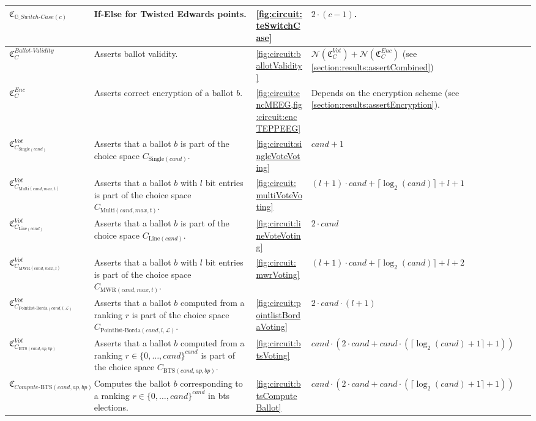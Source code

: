 \begin{longtable}{|L{4cm}|L{5.5cm}|L{1.3cm}|L{3cm}|}
    $\mathfrak{C}_{\mathbb{G}\_Switch\text{-}Case(c)}$ & If-Else for Twisted Edwards points. & \cref{fig:circuit:teSwitchCase} & $2\cdot (c-1)$.\\
    \hline
    $\mathfrak{C}_{C}^{Ballot\text{-}Validity}$ & Asserts ballot validity. & \cref{fig:circuit:ballotValidity} & $\mathcal{N}(\mathfrak{C}_C^{Vot}) + \mathcal{N}(\mathfrak{C}_C^{Enc})$ (see \cref{section:results:assertCombined})\\
    $\mathfrak{C}_{C}^{Enc}$ & Asserts correct encryption of a ballot $b$. & \cref{fig:circuit:encMEEG,fig:circuit:encTEPPEEG} & Depends on the encryption scheme (see \cref{section:results:assertEncryption}). \\
    $\mathfrak{C}_{C_{\text{Single}(cand)}}^{Vot}$ & Asserts that a ballot $b$ is part of the choice space $C_{\text{Single}(cand)}$. & \cref{fig:circuit:singleVoteVoting} & $cand + 1$\\
    $\mathfrak{C}_{C_{\text{Multi}(cand, max, t)}}^{Vot}$ & Asserts that a ballot $b$ with $l$ bit entries is part of the choice space $C_{\text{Multi}(cand, max, t)}$. & \cref{fig:circuit:multiVoteVoting} & $(l+1)\cdot cand + \lceil\log_2(cand)\rceil + l + 1$\\
    $\mathfrak{C}_{C_{\text{Line}(cand)}}^{Vot}$ & Asserts that a ballot $b$ is part of the choice space $C_{\text{Line}(cand)}$. & \cref{fig:circuit:lineVoteVoting} & $2\cdot cand$\\
    $\mathfrak{C}_{C_{\text{MWR}(cand, max, t)}}^{Vot}$ & Asserts that a ballot $b$ with $l$ bit entries is part of the choice space $C_{\text{MWR}(cand, max, t)}$. & \cref{fig:circuit:mwrVoting} & $(l+1)\cdot cand + \lceil\log_2(cand)\rceil + l + 2$\\
    $\mathfrak{C}_{C_{\text{Pointlist-Borda}(cand, l, \mathcal{L})}}^{Vot}$ & Asserts that a ballot $b$ computed from a ranking $r$ is part of the choice space $C_{\text{Pointlist-Borda}(cand, l, \mathcal{L})}$. & \cref{fig:circuit:pointlistBordaVoting} & $2\cdot cand\cdot (l+1)$\\
    $\mathfrak{C}_{C_{\text{BTS}(cand, ap, bp)}}^{Vot}$ & Asserts that a ballot $b$ computed from a ranking $r\in\{0,\dots, cand\}^{cand}$ is part of the choice space $C_{\text{BTS}(cand, ap, bp)}$. & \cref{fig:circuit:btsVoting} & $cand\cdot(2\cdot cand + cand\cdot (\lceil\log_2(cand) + 1\rceil + 1))$\\
    $\mathfrak{C}_{Compute\text{-BTS}(cand, ap, bp)}$ & Computes the ballot $b$ corresponding to a ranking $r\in\{0,\dots, cand\}^{cand}$ in \gls{bts} elections. & \cref{fig:circuit:btsComputeBallot} & $cand\cdot(2\cdot cand + cand\cdot (\lceil\log_2(cand) + 1\rceil + 1))$\\

\end{longtable}
